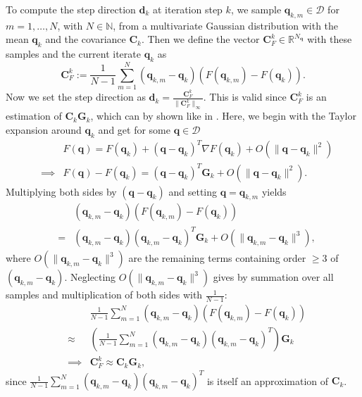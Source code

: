 To compute the step direction $\mathbf{d}_k$ at iteration step $k$, we sample $\mathbf{q}_{k,m}\in\mathcal{D}$ for $m=1,\dotsc,N$, with $N\in\mathbb{N}$, from a multivariate Gaussian distribution with the mean $\mathbf{q}_k$ and the covariance $\mathbf{C}_k$. Then we define the vector $\mathbf{C}_F^k\in\mathbb{R}^{N_\mathbf{q}}$ with these samples and the current iterate $\mathbf{q}_k$ as
\begin{equation}
\label{CqkF}
\mathbf{C}_F^k:=\frac{1}{N-1}\sum_{m=1}^N(\mathbf{q}_{k,m}-\mathbf{q}_k)(F(\mathbf{q}_{k,m})-F(\mathbf{q}_k)).
\end{equation}
Now we set the step direction as $\mathbf{d}_k=\frac{\mathbf{C}_F^k}{\|\mathbf{C}_F^k\|_\infty}$. This is valid since $\mathbf{C}_F^k$ is an estimation of $\mathbf{C}_k\mathbf{G}_k$, which can by shown like in \cite{OGUNTOLA2021109165}. Here, we begin with the Taylor expansion around $\mathbf{q}_k$ and get for some $\mathbf{q}\in\mathcal{D}$
\begin{eqnarray*}
&&F(\mathbf{q})=F(\mathbf{q}_k)+(\mathbf{q}-\mathbf{q}_k)^T\nabla F(\mathbf{q}_k)+O(\|\mathbf{q}-\mathbf{q}_k\|^2)\\
&\implies&F(\mathbf{q})-F(\mathbf{q}_k)=(\mathbf{q}-\mathbf{q}_k)^T\mathbf{G}_k+O(\|\mathbf{q}-\mathbf{q}_k\|^2).
\end{eqnarray*}
Multiplying both sides by $(\mathbf{q}-\mathbf{q}_k)$ and setting $\mathbf{q}=\mathbf{q}_{k,m}$ yields
\begin{eqnarray*}
&&(\mathbf{q}_{k,m}-\mathbf{q}_k)(F(\mathbf{q}_{k,m})-F(\mathbf{q}_k))\\
&=&(\mathbf{q}_{k,m}-\mathbf{q}_k)(\mathbf{q}_{k,m}-\mathbf{q}_k)^T\mathbf{G}_k+O(\|\mathbf{q}_{k,m}-\mathbf{q}_k\|^3),
\end{eqnarray*}
where $O(\|\mathbf{q}_{k,m}-\mathbf{q}_k\|^3)$ are the remaining terms containing order $\geq3$ of $(\mathbf{q}_{k,m}-\mathbf{q}_k)$. Neglecting $O(\|\mathbf{q}_{k,m}-\mathbf{q}_k\|^3)$ gives by summation over all samples and multiplication of both sides with $\frac{1}{N-1}$:
\begin{eqnarray*}
&&\frac{1}{N-1}\sum_{m=1}^N(\mathbf{q}_{k,m}-\mathbf{q}_k)(F(\mathbf{q}_{k,m})-F(\mathbf{q}_k))\\
&\approx&\left(\frac{1}{N-1}\sum_{m=1}^N(\mathbf{q}_{k,m}-\mathbf{q}_k)(\mathbf{q}_{k,m}-\mathbf{q}_k)^T\right)\mathbf{G}_k\\
&\implies&\mathbf{C}_F^k\approx\mathbf{C}_k\mathbf{G}_k,
\end{eqnarray*}
since $\frac{1}{N-1}\sum_{m=1}^N(\mathbf{q}_{k,m}-\mathbf{q}_k)(\mathbf{q}_{k,m}-\mathbf{q}_k)^T$ is itself an approximation of $\mathbf{C}_k$.\\

